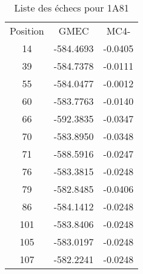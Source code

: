     \begin{table}[h]
      \centering

      \begin{tabular}{ccc}


        \toprule
        Position & GMEC & MC4- \\
        \cmidrule{1-3}
        14 & -584.4693 & -0.0405 \\
        39 & -584.7378 & -0.0111 \\
        55 & -584.0477 & -0.0012 \\
        60 & -583.7763 & -0.0140 \\
        66 & -592.3835 & -0.0347 \\
        70 & -583.8950 & -0.0348 \\
        71 & -588.5916 & -0.0247 \\
        76 & -583.3815 & -0.0248 \\
        79 & -582.8485 & -0.0406 \\
        86 & -584.1412 & -0.0248 \\
        101 & -583.8406 & -0.0248 \\
        105 & -583.0197 & -0.0248 \\
        107 & -582.2241 & -0.0248 \\

        \bottomrule

      \end{tabular}      
      \caption{Liste des échecs pour 1A81}
\label{tab:result_1_active_1A81}      
    \end{table}



